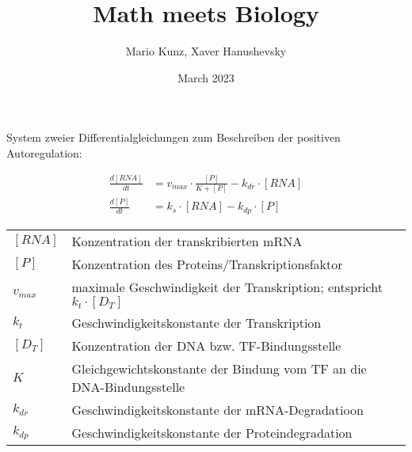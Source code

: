 \documentclass{article}
\title{Math meets Biology}
\author{Mario Kunz, Xaver Hanushevsky}
\date{March 2023}
\begin{document}
\maketitle

\newpage

System zweier Differentialgleichungen zum Beschreiben der positiven Autoregulation:

\begin{align*}
    \frac{d[RNA]}{dt}&=v_{max}\cdot\frac{[P]}{K+[P]}-k_{dr}\cdot[RNA] \\
    \frac{d[P]}{dt}&=k_s\cdot[RNA]-k_{dp}\cdot[P]
\end{align*}

\begin{tabular}{l l}
     $[RNA]$ & Konzentration der transkribierten mRNA \\
     $[P]$ & Konzentration des Proteins/Transkriptionsfaktor \\
     $v_{max}$ & maximale Geschwindigkeit der Transkription; entspricht $k_t\cdot [D_T]$ \\
     $k_t$ & Geschwindigkeitskonstante der Transkription \\
     $[D_T]$ & Konzentration der DNA bzw. TF-Bindungsstelle \\
     $K$ & Gleichgewichtskonstante der Bindung vom TF an die DNA-Bindungsstelle \\
     $k_{dr}$ & Geschwindigkeitskonstante der mRNA-Degradatioon \\
     $k_{dp}$ & Geschwindigkeitskonstante der Proteindegradation
\end{tabular}
\end{document}
